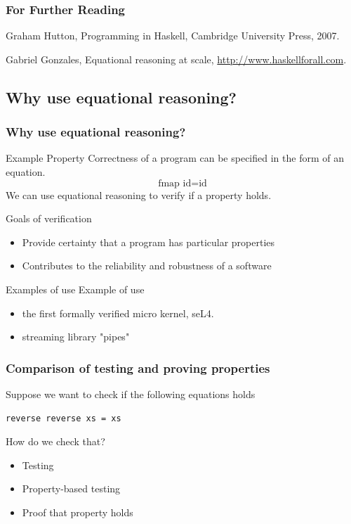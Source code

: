 \documentclass{beamer}
\begin{document}
\begin{frame}
  \frametitle{For Further Reading}

  \begin{thebibliography}{Subramaniam, 2011}

Graham Hutton,
Programming in Haskell,
Cambridge University Press,
2007.

Gabriel Gonzales,
Equational reasoning at scale, 
\url{http://www.haskellforall.com}.

\end{thebibliography}
\end{frame}

\appendix

\subsection{Why use equational reasoning?}
\begin{frame}
\frametitle{Why use equational reasoning?}
\begin{block}{Example Property}
Correctness of a program can be specified in the form of an equation.
\begin{equation}
\text{fmap } \text{id}  =  \text{id}  
\end{equation}
We can use equational reasoning to verify if a property holds.  
\end{block}
\begin{block}{Goals of verification}
\begin{itemize}
\item Provide certainty that a program has particular properties
\item Contributes to the reliability and robustness of a software
\end{itemize}  
\end{block}
\begin{block}{Examples of use}
Example of use
\begin{itemize}
\item the first formally verified micro kernel, seL4.
\item streaming library "pipes"
\end{itemize}  
\end{block}
\end{frame}



\begin{frame}[fragile]
  \frametitle{Comparison of testing and proving properties}
  Suppose we want to check if the following equations holds
\begin{verbatim}
reverse reverse xs = xs
\end{verbatim}
How do we check that?
\begin{itemize}
\item Testing
\item Property-based testing
\item Proof that property holds
\end{itemize}

\end{frame}
\end{document}
